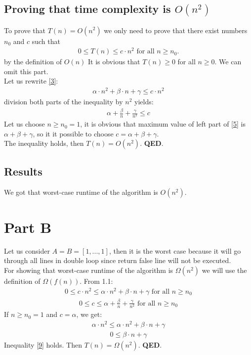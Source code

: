 \documentclass[12pt]{article}
\begin{document}
\subsection{Proving that time complexity is $O(n^2)$}
To prove that $T(n) = O(n^2)$ we only need to prove that there exist numbers $n_{0}$ and $c$ such that
\begin{align}\label{3}
0 \leq T(n) \leq c \cdot n ^ 2 \text{ for all } n \geq n_{0}.
\end{align}
by the definition of $O(n)$
It is obvious that $T(n) \geq 0$ for all $n \geq 0$. We can omit this part.\\
Let us rewrite \eqref{3}:
\begin{align}\label{4}
\alpha \cdot n ^ 2 + \beta \cdot n + \gamma \leq c \cdot n ^ 2
\end{align}
division both parts of the inequality by $n^2$ yields:
\begin{align}\label{5}
\alpha + \frac{\beta}{n} + \frac{\gamma}{n ^ 2} \leq c
\end{align}
Let us choose $n \geq n_{0} = 1$, it is obvious that maximum value of left part of \eqref{5} is $\alpha + \beta + \gamma$, so it it possible to choose $c = \alpha + \beta + \gamma$.\\
The inequality holds, then $T(n) = O(n ^ 2)$. \textbf{QED}.
\subsection{Results}
We got that worst-case runtime of the algorithm is $O(n^2)$.

\section{Part B}
Let us consider $A = B = [1, ..., 1]$, then it is the worst case because it will go through all lines in double loop since return false line will not be executed.\\
For showing that worst-case runtime of the algorithm is $\Omega (n ^ 2)$ we will use the definition of $\Omega(f(n))$.
From 1.1:
\begin{align}\label{6}
0 \leq c \cdot n ^ 2 \leq \alpha \cdot n ^ 2 + \beta \cdot n + \gamma \text{ for all } n \geq n_{0}
\end{align}
\begin{align}\label{7}
0 \leq c \leq \alpha + \frac{\beta}{n}+ \frac{\gamma}{n ^ 2} \text{ for all } n \geq n_{0}
\end{align}
If $n \geq n_{0} = 1$ and $c = \alpha$, we get:
\begin{align}\label{8}
\alpha \cdot n ^ 2 \leq \alpha \cdot n ^ 2 + \beta \cdot n + \gamma
\end{align}
\begin{align}\label{9}
0 \leq \beta \cdot n + \gamma
\end{align}
Inequality \eqref{9} holds. Then $T(n) = \Omega (n ^ 2)$. \textbf{QED}.
\end{document}
